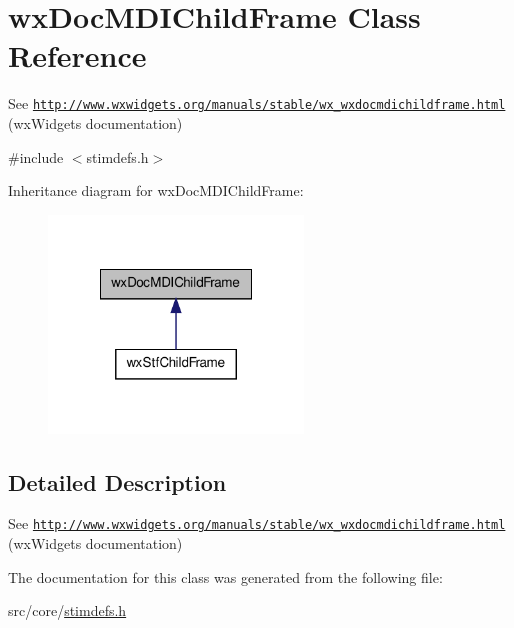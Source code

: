 \hypertarget{classwxDocMDIChildFrame}{
\section{wxDocMDIChildFrame Class Reference}
\label{classwxDocMDIChildFrame}
}


See \href{http://www.wxwidgets.org/manuals/stable/wx_wxdocmdichildframe.html}{\tt http://www.wxwidgets.org/manuals/stable/wx\_\-wxdocmdichildframe.html} (wxWidgets documentation)  




{\ttfamily \#include $<$stimdefs.h$>$}



Inheritance diagram for wxDocMDIChildFrame:
\nopagebreak
\begin{figure}[H]
\begin{center}
\leavevmode
\includegraphics[width=192pt]{classwxDocMDIChildFrame__inherit__graph}
\end{center}
\end{figure}


\subsection{Detailed Description}
See \href{http://www.wxwidgets.org/manuals/stable/wx_wxdocmdichildframe.html}{\tt http://www.wxwidgets.org/manuals/stable/wx\_\-wxdocmdichildframe.html} (wxWidgets documentation) 

The documentation for this class was generated from the following file:\begin{DoxyCompactItemize}
\item 
src/core/\hyperlink{stimdefs_8h}{stimdefs.h}\end{DoxyCompactItemize}
